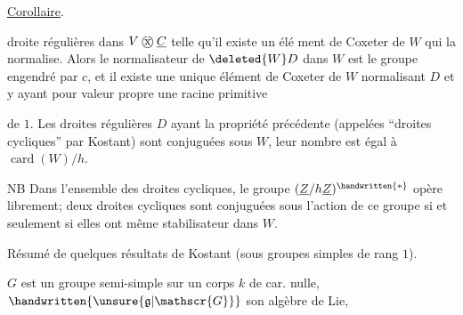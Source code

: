 \uline{Corollaire}.  droite régulières dans $V\mathbin{\text{\textcircled{x}}}\underline{C}$ telle qu'il existe un élé%
ment de Coxeter de $W$ qui la normalise. Alors le normalisateur de $\deleted{W}D$ dans $W$ est le groupe engendré par $c$, et il existe une unique élément de Coxeter de $W$ normalisant $D$ et y ayant pour valeur propre une racine primitive  de $1$. Les droites régulières $D$ ayant la propriété précédente (appelées ``droites cycliques'' par Kostant) sont conjuguées sous $W$, leur nombre est égal à $\operatorname{card}(W)/h$.

NB Dans l'ensemble des droites cycliques, le groupe $(\underline{Z}/h\underline{Z})^{\handwritten{*}}$ opère librement; deux droites cycliques sont conjuguées sous l'action de ce groupe si et seulement si elles ont même stabilisateur dans $W$.

Résumé de quelques résultats de Kostant (sous groupes simples de rang $1$).

$G$ est un groupe semi-simple sur un corps $k$ de car. nulle, $\handwritten{\unsure{\mathfrak{g}|\mathscr{G}}}$ son algèbre de Lie,

